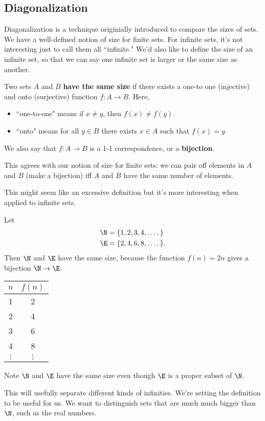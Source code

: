 \subsection{Diagonalization}
Diagonalization is a technique originially introduced to compare the sizes of sets. We have a well-defined notion of size for finite sets. For infinite sets, it's not interesting just to call them all ``infinite." We'd also like to define the size of an infinite set, so that we can say one infinite set is larger or the same size as another.
\begin{df}
Two sets $A$ and $B$ \textbf{have the same size} if there exists a one-to one (injective) and onto (surjective) function $f:A\to B$. Here,
\begin{itemize}
\item ``one-to-one" means if $x\ne y$, then $f(x)\ne f(y)$.
\item ``onto" means for all $y\in B$ there exists $x\in A$ such that $f(x)=y$.
\end{itemize}
We also say that $f:A\to B$ is a 1-1 correspondence, or a \textbf{bijection}.
\end{df}
This agrees with our notion of size for finite sets: we can pair off elements in $A$ and $B$ (make a bijection) iff $A$ and $B$ have the same number of elements.

This might seem like an excessive definition but it's more interesting when applied to infinite sets.
\begin{ex}
Let 
\begin{align*}
\N&=\{1,2,3,4,\ldots, \}\\
\E&=\{2,4,6,8,\ldots, \}.
\end{align*}
Then $\N$ and $\E$ have the same size, because  the function $f(n)=2n$ gives a bijection $\N\to \E$.

\begin{center}
\begin{tabular}{c|c}
$n$ & $f(n)$\tabularnewline
\hline 
1 & 2\tabularnewline
2 & 4\tabularnewline
3 & 6\tabularnewline
4 & 8\tabularnewline
$\vdots$ & $\vdots$\tabularnewline
\end{tabular}
\end{center}

Note $\N$ and $\E$ have the same size even though $\E$ is a proper subset of $\N$.
\end{ex}

This will usefully separate different kinds of infinities. We're setting the definition to be useful for us. We want to distinguish sets that are much much bigger than $\N$, such as the real numbers. 

